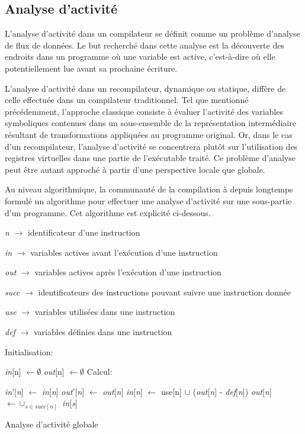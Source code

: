 \documentclass{article} %
\begin{document}
\subsection{Analyse d'activité}
L'analyse d'activité dans un compilateur se définit comme un problème d'analyse de flux de données. Le but recherché dans cette analyse est la découverte des endroits dans un programme où une variable est active, c'est-à-dire où elle potentiellement lue avant sa prochaine écriture.

L'analyse d'activité dans un recompilateur, dynamique ou statique, diffère de celle effectuée dans un compilateur traditionnel. Tel que mentionné précédemment, l'approche classique consiste à évaluer l'activité des variables symboliques contenues dans un sous-ensemble de la représentation intermédiaire résultant de transformations appliquées au programme original. Or, dans le cas d'un recompilateur, l'analyse d'activité se concentrera plutôt sur l'utilisation des registres virtuelles dans une partie de l'exécutable traité. Ce problème d'analyse peut être autant approché à partir d'une perspective locale que globale.

Au niveau algorithmique, la communauté de la compilation à depuis longtemps formulé un algorithme pour effectuer une analyse d'activité sur une sous-partie d'un programme. Cet algorithme est explicité ci-dessous.

\begin{algorithm}[H]
 \KwData
 {
 	
 	\textit{n} $\rightarrow$ identificateur d'une instruction
 
	\textit{in} $\rightarrow$ variables actives avant l'exécution d'une instruction

 	\textit{out} $\rightarrow$ variables actives après l'exécution d'une instruction
 	
 	\textit{succ} $\rightarrow$ identificateurs des instructions pouvant suivre une instruction donnée
 	
 	\textit{use} $\rightarrow$ variables utilisées dans une instruction
 	
 	\textit{def} $\rightarrow$ variables définies dans une instruction
 }
 Initialisation:
 
 {
 	\textit{in}[n] $\leftarrow \emptyset$\;
 	\textit{out}[n] $\leftarrow \emptyset$\;
 }
 Calcul:
 
 {
  	{
  		\textit{in}'[\textit{n}] $\leftarrow$ \textit{in}[\textit{n}]\;
  		\textit{out}'[\textit{n}] $\leftarrow$ \textit{out}[\textit{n}]\;
  		\textit{in}[\textit{n}] $\leftarrow$ use[n] $\cup$ (\textit{out}[\textit{n}] - \textit{def}[\textit{n}])\;
  		\textit{out}[\textit{n}] $\leftarrow \cup_{s \in succ[n]}$ \textit{in}[\textit{s}]\;
  	}
 }
 \caption{Analyse d'activité globale}
\end{algorithm}
\end{document}
